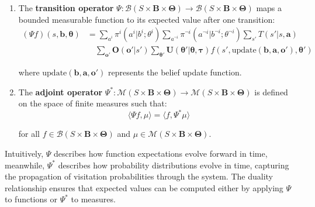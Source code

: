 \begin{definition}
    \hfill
    \begin{enumerate}
        \item The \textbf{transition operator}
              $\Psi: \mathcal{B}(S \times \boldsymbol{B}\times \boldsymbol{\Theta}) \to \mathcal{B}
                  (S \times \boldsymbol{B}\times \boldsymbol{\Theta})$
              maps a bounded measurable function to its expected value after one
              transition:
              \begin{align}
                  (\Psi f)(s, \boldsymbol{b}, \boldsymbol{\theta}) & = \sum_{a^i}\pi^{i}(a^{i}|b^{i}; \theta^{i}) \sum_{a^{\neg i}}\pi^{\neg i}(a^{\neg i}|b^{\neg i}; \theta^{\neg i}) \sum_{s'}T(s'|s, \boldsymbol{a})                                                                                                               \\
                                                                   & \quad \sum_{\boldsymbol{o}'}\boldsymbol{O}(\boldsymbol{o}'|s') \sum_{\boldsymbol{\theta}'}\boldsymbol{U}(\boldsymbol{\theta}'|\boldsymbol{\theta}, \boldsymbol{\tau}) f(s', \text{update}(\boldsymbol{b}, \boldsymbol{a}, \boldsymbol{o}'), \boldsymbol{\theta}')
              \end{align}

              where $\text{update}(\boldsymbol{b}, \boldsymbol{a}, \boldsymbol{o}')$
              represents the belief update function.

        \item The \textbf{adjoint operator}
              $\Psi^{*}: \mathcal{M}(S \times \boldsymbol{B}\times \boldsymbol{\Theta}) \rightarrow
                  \mathcal{M}(S \times \boldsymbol{B}\times \boldsymbol{\Theta})$
              is defined on the space of finite measures such that:
              \begin{equation}
                  \langle \Psi f, \mu \rangle = \langle f, \Psi^{*} \mu \rangle
              \end{equation}

              for all
              $f \in \mathcal{B}(S \times \boldsymbol{B}\times \boldsymbol{\Theta})$ and
              $\mu \in \mathcal{M}(S \times \boldsymbol{B}\times \boldsymbol{\Theta})$.
    \end{enumerate}
\end{definition}

Intuitively, $\Psi$ describes how function expectations evolve forward in time,
meanwhile, $\Psi^{*}$ describes how probability distributions evolve in time,
capturing the propagation of visitation probabilities through the system. The duality
relationship ensures that expected values can be computed either by applying $\Psi$
to functions or $\Psi^{*}$ to measures.

